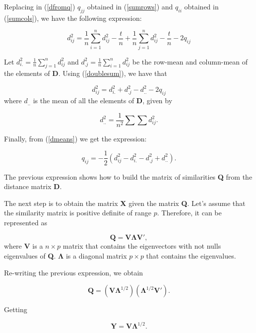 \documentclass[11pt]{report}
\begin{document}
\indent Replacing in (\ref{dfromq}) $q_{jj}$ obtained in (\ref{sumrows}) and $q_{ii}$
obtained in (\ref{sumcols}), we have the following expression:

\begin{equation} \label{generaldij}
d_{ij}^2 = \frac{1}{n}\sum_{i = 1}^n d_{ij}^2 - \frac{t}{n} + \frac{1}{n} \sum_{j = 1}^n d_{ij}^2 -\frac{t}{n} -2q_{ij}
\end{equation}

\indent Let $d_{i.}^2 = \frac{1}{n}\sum_{j = 1}^n d_{ij}^2$ and $d_{.j}^2 = \frac{1}{n}\sum_{i=1}^n d_{ij}^2$ 
be the row-mean and column-mean of the elements of \textbf{D}. Using 
(\ref{doublesum}), we have that

\begin{equation} \label{dmeans}
d_{ij}^2 = d_{i.}^2 + d_{.j}^2 - d_{..}^2-2q_{ij}
\end{equation}
where $d_{..}$ is the mean of all the elements of \textbf{D}, given by

\[
d_{..}^2 = \frac{1}{n^2}\sum \sum d_{ij}^2.
\]

\indent Finally, from (\ref{dmeans}) we get the expression:

\begin{equation} \label{qij2}
q_{ij} = -\frac{1}{2}(d_{ij}^2 - d_{i.}^2 - d_{.j}^2 + d_{..}^2).
\end{equation}

\indent The previous expression shows how to build the matrix of similarities 
\textbf{Q} from the distance matrix \textbf{D}.

\indent The next step is to obtain the matrix \textbf{X} given the matrix 
\textbf{Q}. Let's assume that the similarity matrix is positive definite of 
range $p$. Therefore, it can be represented as

\[
\mathbf{Q} = \mathbf{V}\mathbf{\Lambda}\mathbf{V'},
\]
where $\mathbf{V}$ is a $n \times p$ matrix that contains the eigenvectors with
not nulls eigenvalues of \textbf{Q}. $\mathbf{\Lambda}$ is a diagonal matrix 
$p \times p$ that contains the eigenvalues.

\indent Re-writing the previous expression, we obtain

\begin{equation} \label{generalQ}
\mathbf{Q} = (\mathbf{V}\mathbf{\Lambda}^{1/2})(\mathbf{\Lambda}^{1/2}\mathbf{V'}).
\end{equation}

Getting

\[
\mathbf{Y} = \mathbf{V}\mathbf{\Lambda}^{1/2}.
\]
\end{document}
